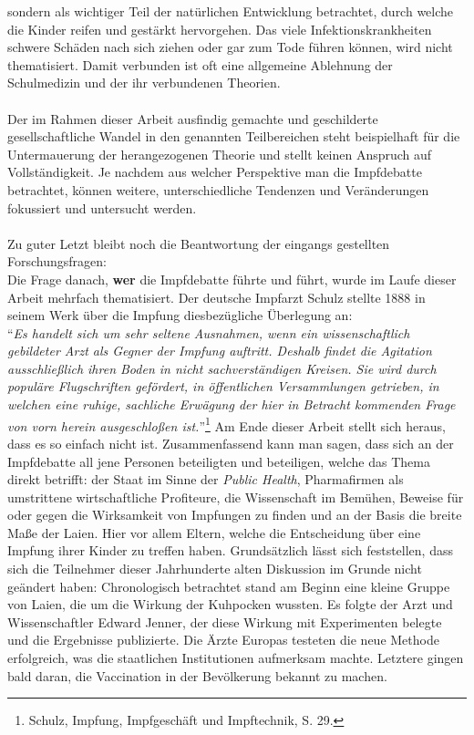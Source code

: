 \documentclass[
    a4paper,
    12pt,
    hyphens,
    chapterprefix=true,
    headheight=33pt,
    footheight=29pt,
    headings=optiontohead,
]{scrartcl}
\begin{document}
{sondern als wichtiger Teil der natürlichen Entwicklung betrachtet, durch
welche die Kinder reifen und gestärkt hervorgehen. Das viele
Infektionskrankheiten schwere Schäden nach sich ziehen oder gar zum
Tode führen können, wird nicht thematisiert. Damit verbunden ist oft eine
allgemeine Ablehnung der Schulmedizin und der ihr verbundenen Theorien. \\
\\
Der im Rahmen dieser Arbeit ausfindig gemachte und geschilderte gesellschaftliche Wandel in den genannten Teilbereichen steht beispielhaft für die Untermauerung der herangezogenen Theorie und stellt keinen Anspruch auf Vollständigkeit. Je nachdem aus welcher Perspektive man die Impfdebatte betrachtet, können weitere, unterschiedliche Tendenzen und Veränderungen fokussiert und untersucht werden. \\
\\
Zu guter Letzt bleibt noch die Beantwortung der eingangs gestellten Forschungsfragen:\\
Die Frage danach, \textbf{wer} die Impfdebatte führte und führt, wurde im Laufe dieser Arbeit mehrfach  thematisiert. Der deutsche Impfarzt Schulz stellte 1888 in seinem Werk über die Impfung diesbezügliche Überlegung an:\\
"`\textit{Es handelt sich um sehr seltene Ausnahmen, wenn ein wissenschaftlich gebildeter Arzt als Gegner der Impfung auftritt. Deshalb findet die Agitation ausschließlich ihren Boden in nicht sachverständigen Kreisen. Sie wird durch populäre Flugschriften gefördert, in öffentlichen Versammlungen getrieben, in welchen eine ruhige, sachliche Erwägung der hier in Betracht kommenden Frage von vorn herein ausgeschloßen ist.}"'\footnote{Schulz, Impfung, Impfgeschäft und Impftechnik, S. 29.}
Am Ende dieser Arbeit stellt sich heraus, dass es so einfach nicht ist. Zusammenfassend kann man sagen, dass sich an der Impfdebatte all jene Personen beteiligten und beteiligen, welche das Thema direkt betrifft: der Staat im Sinne der \textit{Public Health}, Pharmafirmen als umstrittene wirtschaftliche Profiteure, die Wissenschaft im Bemühen, Beweise für oder gegen die Wirksamkeit von Impfungen zu finden und an der Basis die breite Maße der Laien. Hier vor allem Eltern, welche die Entscheidung über eine Impfung ihrer Kinder zu treffen haben. Grundsätzlich lässt sich feststellen, dass sich die Teilnehmer dieser Jahrhunderte alten Diskussion im Grunde nicht geändert haben: Chronologisch betrachtet stand am Beginn eine kleine Gruppe von Laien, die um die Wirkung der Kuhpocken wussten. Es folgte der Arzt und Wissenschaftler Edward Jenner, der diese Wirkung mit Experimenten belegte und die Ergebnisse publizierte.
Die Ärzte Europas testeten die neue Methode erfolgreich, was die staatlichen Institutionen aufmerksam machte.
Letztere gingen bald daran, die Vaccination in der Bevölkerung bekannt zu machen.

}
\end{document}

